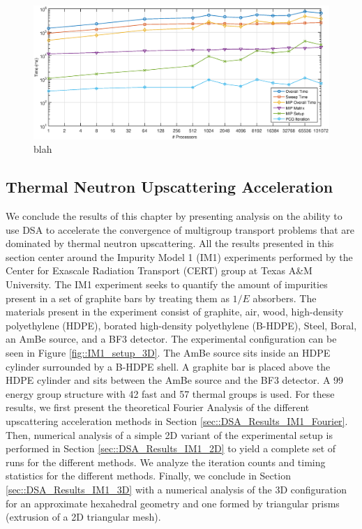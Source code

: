 \begin{figure}
\centering
\includegraphics[width=\textwidth]{figures/sec_DSA/Vulcan_DSA_Timing.eps}
\caption{blah}
\label{fig::DSA_Vulcan_MIP_Timing}
\end{figure}
\fi

\subsection{Thermal Neutron Upscattering Acceleration}
\label{sec::DSA_Results_IM1}

We conclude the results of this chapter by presenting analysis on the ability to use DSA to accelerate the convergence of multigroup transport problems that are dominated by thermal neutron upscattering. All the results presented in this section center around the Impurity Model 1 (IM1) experiments performed by the Center for Exascale Radiation Transport (CERT) group at Texas A\&M University. The IM1 experiment seeks to quantify the amount of impurities present in a set of graphite bars by treating them as $1/E$ absorbers. The materials present in the experiment consist of graphite, air, wood, high-density polyethylene (HDPE), borated high-density polyethylene (B-HDPE), Steel, Boral, an AmBe source, and a BF3 detector. The experimental configuration can be seen in Figure \ref{fig::IM1_setup_3D}. The AmBe source sits inside an HDPE cylinder surrounded by a B-HDPE shell. A graphite bar is placed above the HDPE cylinder and sits between the AmBe source and the BF3 detector. A 99 energy group structure with 42 fast and 57 thermal groups is used. For these results, we first present the theoretical Fourier Analysis of the different upscattering acceleration methods in Section \ref{sec::DSA_Results_IM1_Fourier}. Then, numerical analysis of a simple 2D variant of the experimental setup is performed in Section \ref{sec::DSA_Results_IM1_2D} to yield a complete set of runs for the different methods. We analyze the iteration counts and timing statistics for the different methods. Finally, we conclude in Section \ref{sec::DSA_Results_IM1_3D} with a numerical analysis of the 3D configuration for an approximate hexahedral geometry and one formed by triangular prisms (extrusion of a 2D triangular mesh).

